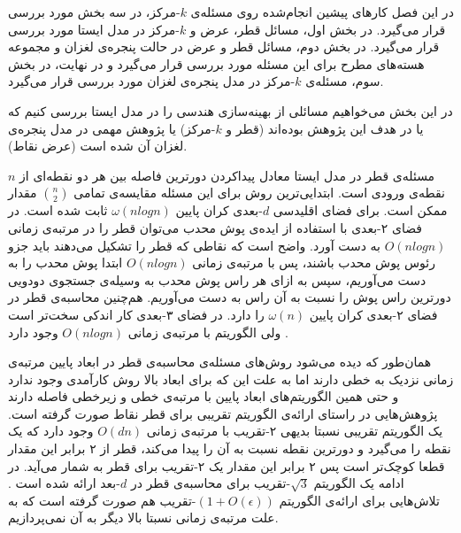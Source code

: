 

در این فصل کارهای پیشین انجام‌شده روی مسئله‌ی $k$-مرکز، در سه بخش مورد بررسی قرار می‌گیرد.
در بخش اول، مسائل قطر، عرض و $k$-مرکز در مدل ایستا مورد بررسی قرار می‌گیرد.
در بخش دوم، مسائل قطر و عرض در حالت پنجره‌ی لغزان و مجموعه هسته‌های مطرح برای این مسئله مورد بررسی قرار می‌گیرد و در نهایت، در بخش سوم، مسئله‌ی $k$-مرکز در مدل پنجره‌ی لغزان مورد بررسی قرار می‌گیرد.


در این بخش می‌خواهیم مسائلی از بهینه‌سازی هندسی را در مدل ایستا بررسی کنیم که یا در هدف این پژوهش بوده‌اند (قطر و  $k$-مرکز) یا پژوهش مهمی در مدل پنجره‌ی لغزان آن شده است (عرض نقاط).

مسئله‌ی قطر در مدل ایستا معادل پیداکردن دورترین فاصله بین هر دو نقطه‌ای از $n$ نقطه‌ی ورودی است. ابتدایی‌ترین روش برای این مسئله مقایسه‌ی تمامی 
$ {{n}\choose{2}} $
مقدار ممکن است. برای فضای اقلیدسی $d$-بعدی کران پایین $\omega(n log n)$ ثابت شده است.  در فضای ۲-بعدی با استفاده از ایده‌ی پوش محدب می‌توان قطر را در مرتبه‌ی زمانی $O(n log n)$ به دست آورد. واضح است که نقاطی که قطر را تشکیل می‌دهند باید جزو رئوس پوش محدب باشند، پس با مرتبه‌ی زمانی $O(n log n)$ ابتدا پوش محدب را به دست می‌آوریم، سپس به ازای هر راس پوش محدب به وسیله‌ی جستجوی دودویی  دورترین راس پوش را نسبت به آن راس به دست می‌آوریم. هم‌چنین محاسبه‌ی قطر در فضای ۲-بعدی کران پایین $\omega(n)$ را دارد. در فضای ۳-بعدی کار اندکی سخت‌تر است ولی الگوریتم با مرتبه‌ی زمانی $O( n log n)$ وجود دارد .

همان‌طور که دیده می‌شود روش‌های مسئله‌ی محاسبه‌ی قطر در ابعاد پایین مرتبه‌ی زمانی نزدیک به خطی دارند اما به علت این که برای ابعاد بالا روش کارآمدی وجود ندارد و حتی همین الگوریتم‌های ابعاد پایین با مرتبه‌ی خطی و زیرخطی فاصله دارند پژوهش‌هایی در راستای ارائه‌ی الگوریتم تقریبی برای قطر نقاط صورت گرفته است. یک الگوریتم تقریبی نسبتا بدیهی ۲-تقریب با مرتبه‌ی زمانی $O(dn)$ وجود دارد که یک نقطه را می‌گیرد و دورترین نقطه نسبت به آن را پیدا می‌کند، قطر از ۲ برابر این مقدار قطعا کوچک‌تر است پس ۲ برابر این مقدار یک ۲-تقریب برای قطر به شمار می‌آید. در ادامه یک الگوریتم $\sqrt{3}$-تقریب برای محاسبه‌ی قطر در $d$-بعد ارائه شده است . تلاش‌هایی برای ارائه‌ی الگوریتم $(1 + O(\epsilon))$-تقریب هم صورت گرفته است که به علت مرتبه‌ی زمانی نسبتا بالا دیگر به آن نمی‌پردازیم.

